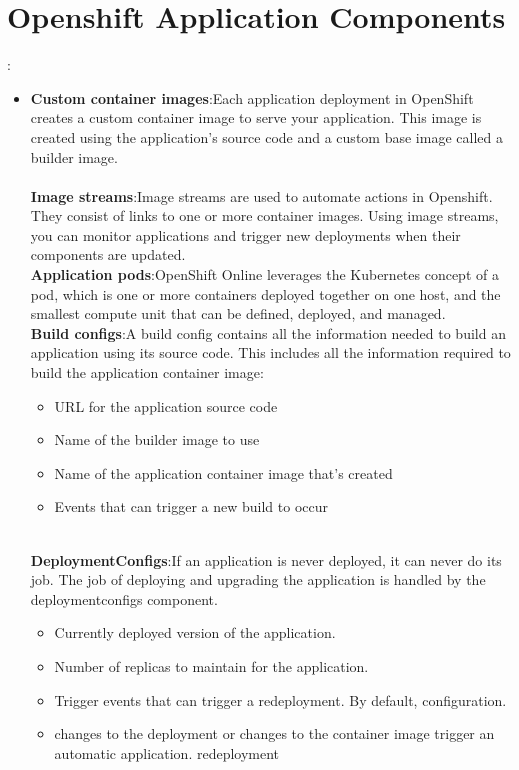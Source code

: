 \documentclass[11pt]{report}
\begin{document}
	\section{Openshift Application Components}:
	\begin{itemize}
		\item 
		\textbf{Custom container images}:Each application deployment in OpenShift creates a custom container image to serve your application. This image is created using the application’s source code and a custom base image called a builder image.
		\ \\
		\ \\
		\textbf{Image streams}:Image streams are used to automate actions in Openshift. They consist of links to one or more container images. Using image streams, you can monitor applications and trigger new deployments when their components are updated.
		\ \\
		\textbf{Application pods}:OpenShift Online leverages the Kubernetes concept of a pod, which is one or more containers deployed together on one host, and the smallest compute unit that can be defined, deployed, and managed.
		\  \\
		\textbf{Build configs}:A build config contains all the information needed to build an application using its source code. This includes all the information required to build the application container image:
		\begin{itemize}
			\item  URL for the application source code
			\item Name of the builder image to use
			\item Name of the application container image that’s created
			\item Events that can trigger a new build to occur
		\end{itemize}
		\ \\
		\textbf{DeploymentConfigs}:If an application is never deployed, it can never do its job. The job of deploying and upgrading the application is handled by the deploymentconfigs component.
		\begin{itemize}
			\item  Currently deployed version of the application.
			\item Number of replicas to maintain for the application.
			\item Trigger events that can trigger a redeployment. By default, configuration.
			\item changes to the deployment or changes to the container image trigger an automatic application. redeployment

\end{itemize}
\end{itemize}
\end{document}
